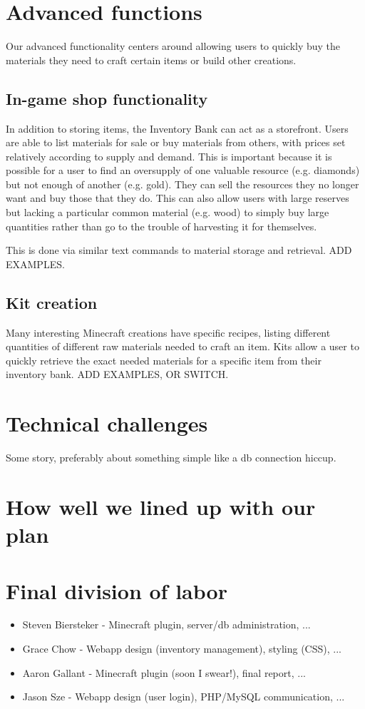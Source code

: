 \documentclass[12pt]{article}
\begin{document}
\section{Advanced functions}
Our advanced functionality centers around allowing users to quickly buy the materials they need to craft certain items or build other creations.

\subsection{In-game shop functionality}
In addition to storing items, the Inventory Bank can act as a storefront. Users are able to list materials for sale or buy materials from others, with prices set relatively according to supply and demand. This is important because it is possible for a user to find an oversupply of one valuable resource (e.g. diamonds) but not enough of another (e.g. gold). They can sell the resources they no longer want and buy those that they do. This can also allow users with large reserves but lacking a particular common material (e.g. wood) to simply buy large quantities rather than go to the trouble of harvesting it for themselves.

This is done via similar text commands to material storage and retrieval. ADD EXAMPLES.

\subsection{Kit creation}
Many interesting Minecraft creations have specific recipes, listing different quantities of different raw materials needed to craft an item. Kits allow a user to quickly retrieve the exact needed materials for a specific item from their inventory bank. ADD EXAMPLES, OR SWITCH.

\section{Technical challenges}
Some story, preferably about something simple like a db connection hiccup.

\section{How well we lined up with our plan}


\section{Final division of labor}
\begin{itemize}
  \item Steven Biersteker - Minecraft plugin, server/db administration, ...
  \item Grace Chow - Webapp design (inventory management), styling (CSS), ...
  \item Aaron Gallant - Minecraft plugin (soon I swear!), final report, ...
  \item Jason Sze - Webapp design (user login), PHP/MySQL communication, ...
\end{itemize}
\end{document}
